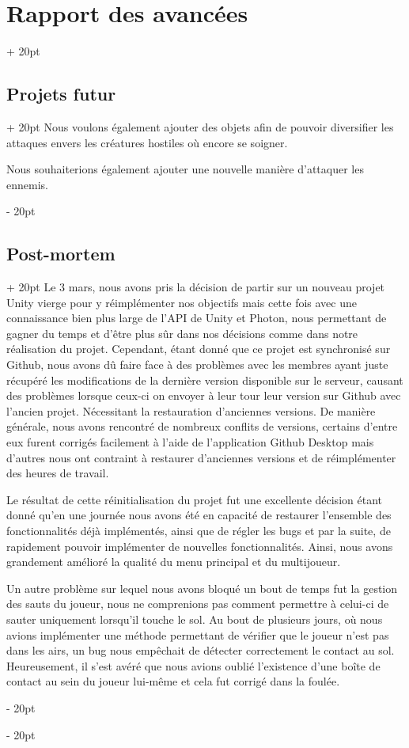 \documentclass[a4paper, 12pt, twoside]{article}
\newcommand{\ind}[1][20pt]{\advance\leftskip + #1}
\newcommand{\deind}[1][20pt]{\advance\leftskip - #1}
\newenvironment{indt}[2][20pt]{#2 \par \ind[#1]}{\par \deind} %
\begin{document}
\begin{indt}{\section{Rapport des avancées}}
\begin{indt}{\subsection{Projets futur}}
            Nous voulons également ajouter des objets afin de pouvoir diversifier les attaques envers les créatures hostiles où encore se soigner.

            Nous souhaiterions également ajouter une nouvelle manière d'attaquer les ennemis.

        \end{indt}

        \begin{indt}{\subsection{Post-mortem}}
            Le 3 mars, nous avons pris la décision de partir sur un nouveau projet Unity vierge pour y réimplémenter nos objectifs mais cette fois avec une connaissance bien plus large de l'API de Unity et Photon, nous permettant de gagner du temps et d'être plus sûr dans nos décisions comme dans notre réalisation du projet. Cependant, étant donné que ce projet est synchronisé sur Github, nous avons dû faire face à des problèmes avec les membres ayant juste récupéré les modifications de la dernière version disponible sur le serveur, causant des problèmes lorsque ceux-ci on envoyer à leur tour leur version sur Github avec l'ancien projet. Nécessitant la restauration d'anciennes versions. De manière générale, nous avons rencontré de nombreux conflits de versions, certains d'entre eux furent corrigés facilement à l'aide de l'application Github Desktop mais d'autres nous ont contraint à restaurer d'anciennes versions et de réimplémenter des heures de travail.

            Le résultat de cette réinitialisation du projet fut une excellente décision étant donné qu'en une journée nous avons été en capacité de restaurer l'ensemble des fonctionnalités déjà implémentés, ainsi que de régler les bugs et par la suite, de rapidement pouvoir implémenter de nouvelles fonctionnalités. Ainsi, nous avons grandement amélioré la qualité du menu principal et du multijoueur.

            Un autre problème sur lequel nous avons bloqué un bout de temps fut la gestion des sauts du joueur, nous ne comprenions pas comment permettre à celui-ci de sauter uniquement lorsqu'il touche le sol. Au bout de plusieurs jours, où nous avions implémenter une méthode permettant de vérifier que le joueur n'est pas dans les airs, un bug nous empêchait de détecter correctement le contact au sol. Heureusement, il s'est avéré que nous avions oublié l'existence d'une boîte de contact au sein du joueur lui-même et cela fut corrigé dans la foulée.


\end{indt}
\end{indt}
\end{document}

